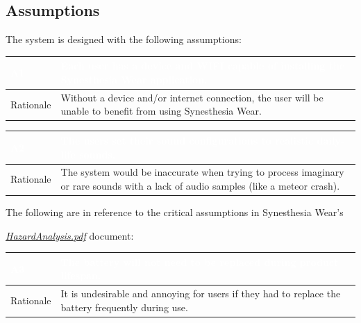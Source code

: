 \documentclass[12pt, titlepage]{article}
\begin{document}
\subsection {Assumptions}
The system is designed with the following assumptions:
\begin{table}[H]
  \centering
  \begin{tabular}{|p{3cm}|p{11cm}|} 
  \hline
  \rowcolor[rgb]{0.071,0.49,0.698} \textcolor{white}{A1} & \textcolor{white}{Each user has a device and WIFI capable of installing the Synesthesia Wear application.}                                          \\ 
  \hline
  \rowcolor[rgb]{0.675,0.827,0.902} Rationale               & Without a device and/or internet connection, the user will be unable to benefit from using Synesthesia Wear.\\
  \hline
  \end{tabular}
\end{table}

\begin{table}[H]
  \centering
  \begin{tabular}{|p{3cm}|p{11cm}|} 
  \hline
  \rowcolor[rgb]{0.071,0.49,0.698} \textcolor{white}{A2} & \textcolor{white}{The users set their sound configurations to realistic daily-life sounds.}                                    \\ 
  \hline
  \rowcolor[rgb]{0.675,0.827,0.902} Rationale               & The system would be inaccurate when trying to process \quad imaginary or rare sounds with a lack of audio samples (like a meteor crash).\\
  \hline
  \end{tabular}
\end{table}

The following are in reference to the critical assumptions in Synesthesia Wear's

\href{https://github.com/jordanbierbrier/capstone/blob/main/docs/HazardAnalysis/HazardAnalysis.pdf}{\textit{HazardAnalysis.pdf}} document:

\begin{table}[H]
  \centering
  \begin{tabular}{|p{3cm}|p{11cm}|} 
  \hline
  \rowcolor[rgb]{0.071,0.49,0.698} \textcolor{white}{A3} & \textcolor{white}{The battery will not need to be replaced during product \quad lifespan.}                                          \\ 
  \hline
  \rowcolor[rgb]{0.675,0.827,0.902} Rationale               & It is undesirable and annoying for users if they had to replace the battery frequently during use.\\
  \hline
  \end{tabular}
\end{table}
\end{document}
